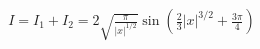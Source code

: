 \documentclass[preview]{standalone}
\begin{document}
\begin{align*}
I=I_1+I_2=2\sqrt{\frac{\pi}{|x|^{1/2}}}\sin(\frac{2}{3}|x|^{3/2}+\frac{3\pi}{4})
\end{align*}
\end{document}
